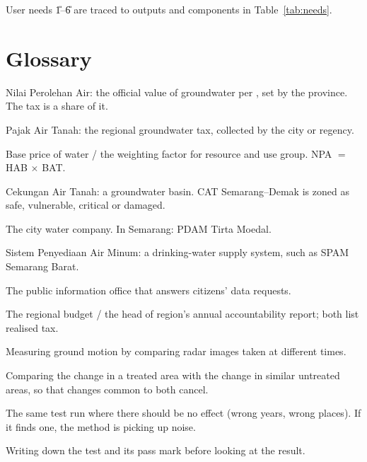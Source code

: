 User needs \U{1}--\U{6} are traced to outputs and components in Table~\ref{tab:needs}.

\section{Glossary}

\begin{description}[leftmargin=34mm,style=nextline,font=\sffamily\bfseries\small,itemsep=1pt]
\item[NPA] Nilai Perolehan Air: the official value of groundwater per \mthree, set by the province. The tax is a share of it.
\item[PAT] Pajak Air Tanah: the regional groundwater tax, collected by the city or regency.
\item[HAB / BAT] Base price of water / the weighting factor for resource and use group. NPA $=$ HAB $\times$ BAT.
\item[CAT] Cekungan Air Tanah: a groundwater basin. CAT Semarang--Demak is zoned as safe, vulnerable, critical or damaged.
\item[PDAM] The city water company. In Semarang: PDAM Tirta Moedal.
\item[SPAM] Sistem Penyediaan Air Minum: a drinking-water supply system, such as SPAM Semarang Barat.
\item[PPID] The public information office that answers citizens' data requests.
\item[APBD / LKPJ] The regional budget / the head of region's annual accountability report; both list realised tax.
\item[InSAR] Measuring ground motion by comparing radar images taken at different times.
\item[Difference-in-differences] Comparing the change in a treated area with the change in similar untreated areas, so that changes common to both cancel.
\item[Placebo test] The same test run where there should be no effect (wrong years, wrong places). If it finds one, the method is picking up noise.
\item[Pre-registration] Writing down the test and its pass mark before looking at the result.
\end{description}

